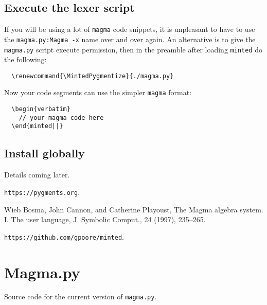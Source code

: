 \documentclass{article}
\begin{document}
\subsection{Execute the lexer script}

If you will be using a lot of \texttt{magma} code snippets, it is
unpleasant to have to use the \texttt{magma.py:Magma -x} name over and
over again. An alternative is to give the \texttt{magma.py} script
execute permission, then in the preamble after loading \texttt{minted}
do the following:

\begin{verbatim}
  \renewcommand{\MintedPygmentize}{./magma.py}
\end{verbatim}

Now your code segments can use the simpler \texttt{magma} format:

\begin{verbatim}
  \begin{verbatim}
    // your magma code here
  \end{minted||}
\end{verbatim}


\subsection{Install globally}

Details coming later.


\begin{thebibliography}{9}

 \texttt{https://pygments.org}.

 Wieb Bosma, John Cannon, and Catherine Playoust, The
  Magma algebra system. I. The user language, J. Symbolic Comput., 24
  (1997), 235–265.

 \texttt{https://github.com/gpoore/minted}.

\end{thebibliography}

\appendix

\section{Magma.py}

Source code for the current version of \texttt{magma.py}.
\end{document}
